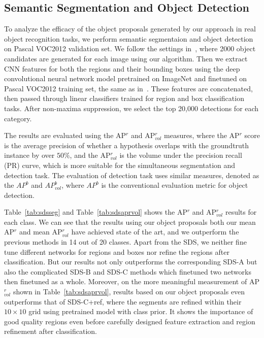 \documentclass[10pt,twocolumn,letterpaper]{article}
\begin{document}
\subsection{Semantic Segmentation and Object Detection}
To analyze the efficacy of the object proposals generated by our approach in real object recognition tasks, we perform semantic segmentaion and object detection on Pascal VOC2012 validation set. We follow the settings in~\cite{Arbelaez14}, where 2000 object candidates are generated for each image using our algorithm. Then we extract CNN features for both the regions and their bounding boxes using the deep convolutional neural network model pretrained on ImageNet and finetuned on Pascal VOC2012 training set, the same as in~\cite{Arbelaez14}. These features are concatenated, then passed through linear classifiers trained for region and box classification tasks. After non-maxima suppression, we select the top 20,000 detections for each category. 

The results are evaluated using the AP$^r$ and AP$^r_{vol}$ measures, where the AP$^r$ score is the average precision of whether a hypothesis overlaps with the groundtruth instance by over $50\%$, and the AP$^r_{vol}$ is the volume under the precision recall (PR) curve, which is more suitable for the simultaneous segmentation and detection task. The evaluation of detection task uses similar measures, denoted as the $AP^b$ and $AP^b_{vol}$, where $AP^b$ is the conventional evaluation metric for object detection. 

Table~\ref{tab:sdsseg} and Table~\ref{tab:sdsaprvol} shows the AP$^r$ and AP$^r_{vol}$ results for each class. We can see that the results using our object proposals both our mean AP$^r$ and mean AP$^r_{vol}$ have achieved state of the art, and we outperform the previous methods in 14 out of 20 classes. Apart from the SDS, we neither fine tune different networks for regions and boxes nor refine the regions after classification. But our results not only outperforms the corresponding SDS-A but also the complicated SDS-B and SDS-C methods which finetuned two networks then finetuned as a whole. Moreover, on the more meaningful measurement of AP$^r_{vol}$ shown in Table~\ref{tab:sdsaprvol}, results based on our object proposals even outperforms that of SDS-C+ref, where the segments are refined within their $10\times 10$ grid using pretrained model with class prior. It shows the importance of good quality regions even before carefully designed feature extraction and region refinement after classification.  
\end{document}
